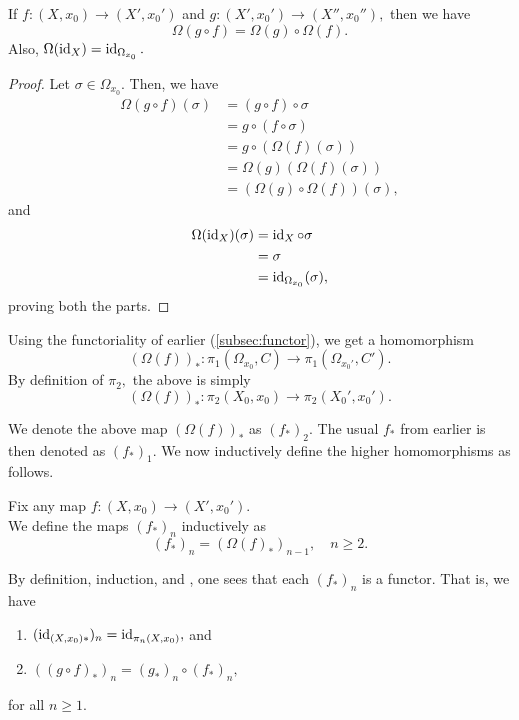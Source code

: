 \documentclass[12pt]{article}
\begin{document}
\begin{prop} \label{prop:omegaisfunc}
	If $f:(X, x_0) \to (X', x_0')$ and $g:(X', x_0') \to (X'', x_0''),$ then we have
	\begin{equation*} 
		\Omega(g\circ f) = \Omega(g)\circ\Omega(f).
	\end{equation*}
	Also, $\Omega(\operatorname{id}_{X}) = \operatorname{id}_{\Omega_{x_0}}.$
\end{prop}
\begin{proof} 
	Let $\sigma \in \Omega_{x_0}.$ Then, we have
	\begin{align*} 
		\Omega(g\circ f)(\sigma) &= (g\circ f)\circ\sigma \\
		&= g\circ(f\circ\sigma)\\
		&= g\circ(\Omega(f)(\sigma))\\
		&= \Omega(g)(\Omega(f)(\sigma))\\
		&= (\Omega(g)\circ\Omega(f))(\sigma),
	\end{align*}
	and
	\begin{align*} 
		\Omega(\operatorname{id}_X)(\sigma) &= \operatorname{id}_X\circ\sigma\\
		&= \sigma\\
		&= \operatorname{id}_{\Omega_{x_0}}(\sigma),
	\end{align*}
	proving both the parts.
\end{proof}
Using the functoriality of earlier (\cref{subsec:functor}), we get a homomorphism
\begin{equation*} 
	(\Omega(f))_* : \pi_1(\Omega_{x_0}, C) \to \pi_1(\Omega_{x_0'}, C').
\end{equation*}
By definition of $\pi_2,$ the above is simply
\begin{equation*} 
	(\Omega(f))_* : \pi_2(X_0, x_0) \to \pi_2(X_0', x_0').
\end{equation*}

We denote the above map $(\Omega(f))_*$ as $(f_*)_2.$ The usual $f_*$ from earlier is then denoted as $(f_*)_1.$ We now inductively define the higher homomorphisms as follows.

\begin{defn}
	Fix any map $f:(X, x_0) \to (X', x_0').$\\
	We define the maps $(f_*)_n$ inductively as
	\begin{equation*} 
		(f_*)_n = (\Omega(f)_*)_{n-1}, \quad n \ge 2.
	\end{equation*}
\end{defn}

By definition, induction, and , one sees that each $(f_*)_{n}$ is a functor. That is, we have
\begin{enumerate}
	\item $(\operatorname{id}_{(X, x_0)*})_n = \operatorname{id}_{\pi_n(X, x_0)},$ and
	\item $\left((g\circ f)_*\right)_n = (g_*)_n\circ(f_*)_n,$
\end{enumerate}
for all $n \ge 1.$
\end{document}
